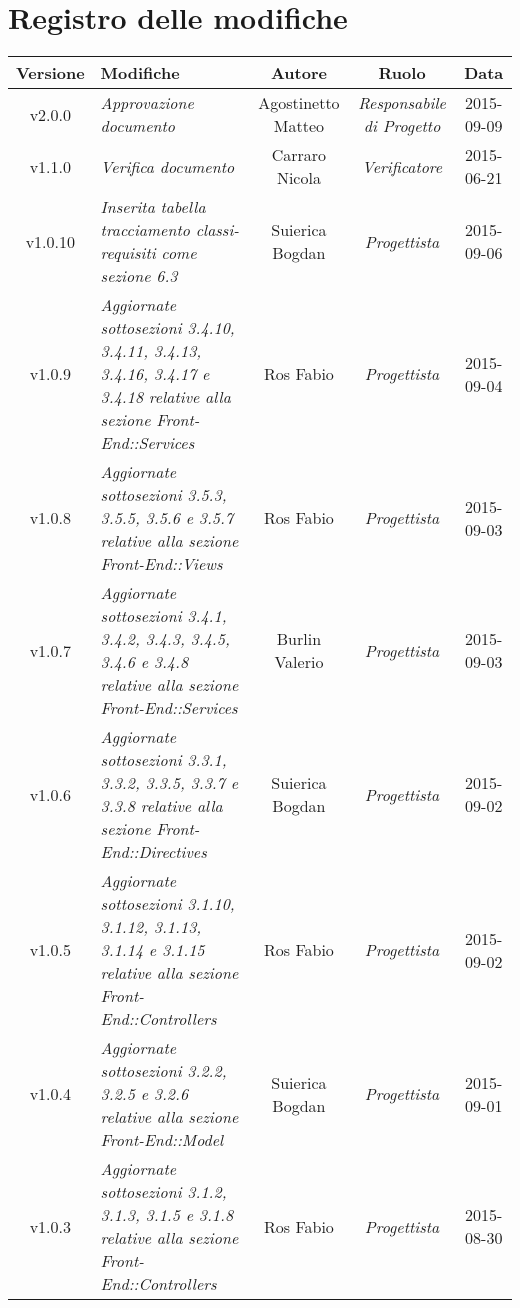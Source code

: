 \newpage
\section*{Registro delle modifiche}

\begin{table}[h]
\centering
\begin{tabular}{|c|p{}|c|c|c|}
	\toprule
		\textbf{Versione} & \textbf{Modifiche} & \textbf{Autore} & \textbf{Ruolo} & \textbf{Data}\\
	\midrule
	\midrule
		v2.0.0 & \textit{Approvazione documento} & Agostinetto Matteo & \textit{Responsabile di Progetto} & 2015-09-09\\
	\midrule
		v1.1.0 & \textit{Verifica documento} & Carraro Nicola & \textit{Verificatore} & 2015-06-21\\	
	\midrule
		v1.0.10 & \textit{Inserita tabella tracciamento classi-requisiti come sezione 6.3} & Suierica Bogdan & \textit{Progettista} & 2015-09-06\\
	\midrule
		v1.0.9 & \textit{Aggiornate sottosezioni 3.4.10, 3.4.11, 3.4.13, 3.4.16, 3.4.17 e 3.4.18 relative alla sezione Front-End::Services} & Ros Fabio & \textit{Progettista} & 2015-09-04\\
	\midrule
		v1.0.8 & \textit{Aggiornate sottosezioni 3.5.3, 3.5.5, 3.5.6 e 3.5.7 relative alla sezione Front-End::Views} & Ros Fabio & \textit{Progettista} & 2015-09-03\\
	\midrule
		v1.0.7 & \textit{Aggiornate sottosezioni 3.4.1, 3.4.2, 3.4.3, 3.4.5, 3.4.6 e 3.4.8 relative alla sezione Front-End::Services} & Burlin Valerio & \textit{Progettista} & 2015-09-03\\
	\midrule
		v1.0.6 & \textit{Aggiornate sottosezioni 3.3.1, 3.3.2, 3.3.5, 3.3.7 e 3.3.8 relative alla sezione Front-End::Directives} & Suierica Bogdan & \textit{Progettista} & 2015-09-02\\
	\midrule
		v1.0.5 & \textit{Aggiornate sottosezioni 3.1.10, 3.1.12, 3.1.13, 3.1.14 e 3.1.15 relative alla sezione Front-End::Controllers} & Ros Fabio & \textit{Progettista} & 2015-09-02\\
	\midrule
		v1.0.4 & \textit{Aggiornate sottosezioni 3.2.2, 3.2.5 e 3.2.6 relative alla sezione Front-End::Model} & Suierica Bogdan & \textit{Progettista} & 2015-09-01\\
	\midrule
		v1.0.3 & \textit{Aggiornate sottosezioni 3.1.2, 3.1.3, 3.1.5 e 3.1.8 relative alla sezione Front-End::Controllers} & Ros Fabio & \textit{Progettista} & 2015-08-30\\
	\bottomrule
\end{tabular}
\end{table}

